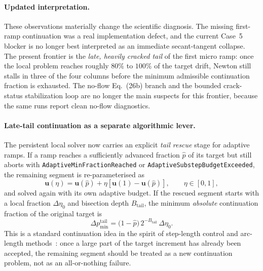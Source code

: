 \paragraph{Updated interpretation.}
These observations materially change the scientific diagnosis.  The missing
first-ramp continuation was a real implementation defect, and the current
Case~5 blocker is no longer best interpreted as an immediate secant-tangent
collapse.  The present frontier is the \emph{late, heavily cracked tail} of
the first micro ramp: once the local problem reaches roughly \(80\%\) to
\(100\%\) of the target drift, Newton still stalls in three of the four
columns before the minimum admissible continuation fraction is exhausted.  The
no-flow Eq.~(26b) branch and the bounded crack-status stabilization loop are
no longer the main suspects for this frontier, because the same runs report
clean no-flow diagnostics.

\paragraph{Late-tail continuation as a separate algorithmic lever.}
The persistent local solver now carries an explicit \emph{tail rescue} stage
for adaptive ramps.  If a ramp reaches a sufficiently advanced fraction
\(\hat{p}\) of its target but still aborts with
\texttt{AdaptiveMinFractionReached} or
\texttt{AdaptiveSubstepBudgetExceeded}, the remaining segment is re-parameterised
as
\begin{equation}
  \mathbf{u}(\eta)
  = \mathbf{u}(\hat{p})
    + \eta\left[\mathbf{u}(1) - \mathbf{u}(\hat{p})\right],
  \qquad \eta \in [0,1],
\end{equation}
and solved again with its own adaptive budget.  If the rescued segment starts
with a local fraction \(\Delta \eta_0\) and bisection depth \(B_{\text{tail}}\),
the minimum \emph{absolute} continuation fraction of the original target is
\begin{equation}
  \Delta p^{\text{tail}}_{\min}
  = \bigl(1-\hat{p}\bigr)\,2^{-B_{\text{tail}}}\,\Delta\eta_0.
  \label{eq:tail-rescue-min-frac}
\end{equation}
This is a standard continuation idea in the spirit of step-length control and
arc-length methods~\cite{Riks1979,Crisfield1981}: once a large part of the
target increment has already been accepted, the remaining segment should be
treated as a new continuation problem, not as an all-or-nothing failure.

